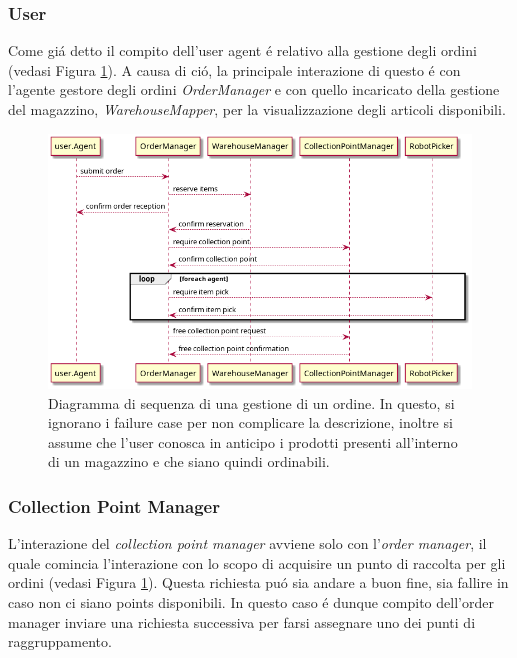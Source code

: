 \subsubsection{User}
Come gi\'a detto il compito dell'user agent \'e relativo alla gestione degli ordini (vedasi Figura \ref{fig:order_management-sequence_diagram}). A causa di ci\'o, la principale interazione di questo \'e con l'agente gestore degli ordini \textit{OrderManager} e con quello incaricato della gestione del magazzino, \textit{WarehouseMapper}, per la visualizzazione degli articoli disponibili.
\begin{figure}[!ht]\centering
    \includegraphics[width=\textwidth]{section/design/figure/order_management-sequence_diagram.png}
    \caption{Diagramma di sequenza di una gestione di un ordine. In questo, si ignorano i failure case per non complicare la descrizione, inoltre si assume che l'user conosca in anticipo i prodotti presenti all'interno di un magazzino e che siano quindi ordinabili.}
    \label{fig:order_management-sequence_diagram}
\end{figure}

\subsubsection{Collection Point Manager}
L'interazione del \textit{collection point manager} avviene solo con l'\textit{order manager}, il quale comincia l'interazione con lo scopo di acquisire un punto di raccolta per gli ordini (vedasi Figura \ref{fig:order_management-sequence_diagram}). Questa richiesta pu\'o sia andare a buon fine, sia fallire in caso non ci siano points disponibili. In questo caso \'e dunque compito dell'order manager inviare una richiesta successiva per farsi assegnare uno dei punti di raggruppamento.


